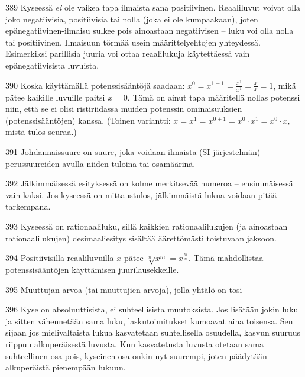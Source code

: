 \begin{Vastaus}{389}
Kyseessä \textit{ei} ole vaikea tapa ilmaista sana positiivinen. Reaaliluvut voivat olla joko negatiivisia, positiivisia tai nolla (joka ei ole kumpaakaan), joten epänegatiivinen-ilmaisu sulkee pois ainoastaan negatiivisen -- luku voi olla nolla tai positiivinen. Ilmaisuun törmää usein määrittelyehtojen yhteydessä. Esimerkiksi parillisia juuria voi ottaa reaalilukuja käytettäessä vain epänegatiivisista luvuista.
\end{Vastaus}
\begin{Vastaus}{390}
Koska käyttämällä potenssisääntöjä saadaan: $x^0=x^{1-1}=\frac{x^1}{x^1}=\frac{x}{x}=1$, mikä pätee kaikille luvuille paitsi $x=0$. Tämä on ainut tapa määritellä nollas potenssi niin, että se ei olisi ristiriidassa muiden potenssin ominaisuuksien (potenssisääntöjen) kanssa. (Toinen variantti: $x=x^1=x^{0+1}=x^0 \cdot x^1 = x^0 \cdot x$, mistä tulos seuraa.)
\end{Vastaus}
\begin{Vastaus}{391}
Johdannaissuure on suure, joka voidaan ilmaista (SI-järjestelmän) perussuureiden avulla niiden tuloina tai osamäärinä.
\end{Vastaus}
\begin{Vastaus}{392}
Jälkimmäisessä esityksessä on kolme merkitsevää numeroa -- ensimmäisessä vain kaksi. Jos kyseessä on mittaustulos, jälkimmäistä lukua voidaan pitää tarkempana.
\end{Vastaus}
\begin{Vastaus}{393}
Kyseessä on rationaaliluku, sillä kaikkien rationaalilukujen (ja ainoastaan rationaalilukujen) desimaaliesitys sisältää äärettömästi toistuvaan jaksoon.
\end{Vastaus}
\begin{Vastaus}{394}
Positiivisilla reaaliluvuilla $x$ pätee $\sqrt[n]{x^m} = x^{\frac{m}{n}}$. Tämä mahdollistaa potenssisääntöjen käyttämisen juurilausekkeille.
\end{Vastaus}
\begin{Vastaus}{395}
Muuttujan arvoa (tai muuttujien arvoja), jolla yhtälö on tosi
\end{Vastaus}
\begin{Vastaus}{396}
	Kyse on absoluuttisista, ei suhteellisista muutoksista. Jos lisätään jokin luku ja sitten vähennetään sama luku, laskutoimitukset kumoavat aina toisensa. Sen sijaan jos mielivaltaista lukua kasvatetaan suhtellisella osuudella, kasvun suuruus riippuu alkuperäisestä luvusta. Kun kasvatetusta luvusta otetaan sama suhteellinen osa pois, kyseinen osa onkin nyt suurempi, joten päädytään alkuperäistä pienempään lukuun.
	
\end{Vastaus}
